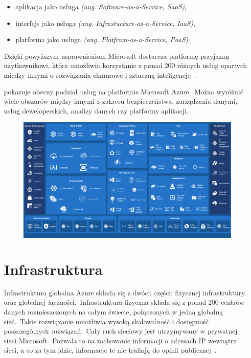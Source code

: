 \begin{itemize}
    \item aplikacja jako usługa \textit{(ang. Software-as-a-Service, SaaS)},
    \item interfejs jako usługa \textit{(ang. Infrastucture-as-a-Service, IaaS)},
    \item platforma jako usługa \textit{(ang. Platfrom-as-a-Service, PaaS)}.
\end{itemize}
Dzięki powyższym usprawnieniom Microsoft dostarcza platformę przyjazną użytkownikowi, która umożliwia korzystanie z ponad 200 różnych usług opartych między innymi o rozwiązania chmurowe i sztuczną inteligencję~\cite{Roosevelt2022, MicrosoftAzurec, Datashift}.

\vfill
\pagebreak

 pokazuje obecny podział usług na platformie Microsoft Azure.\ Można wyróżnić wiele obszarów między innymi z zakresu bezpieczeństwa, zarządzania danymi, usług deweloperskich, analizy danych czy platformy aplikacji.

\begin{figure}[H]
    \includegraphics[width=\textwidth]{images/ms_azure}
    \label{fig:ms-azure}
\end{figure}

\section{Infrastruktura}
Infrastruktura globalna Azure składa się z dwóch części: fizycznej infrastruktury oraz globalnej łączności.\ Infrastruktura fizyczna składa się z ponad 200 centrów danych rozmieszczonych na całym świecie, połączonych w jedną globalną sieć.\ Takie rozwiązanie umożliwia wysoką skalowalność i dostępność poszczególnych rozwiązań.\ Cały ruch sieciowy jest utrzymywany w prywatnej sieci Microsoft.\ Pozwala to na zachowanie informacji o adresach IP wewnątrz sieci, a co za tym idzie, informacje te nie trafiają do opinii publicznej~\cite{MicrosoftAzureb}.\\ \\

